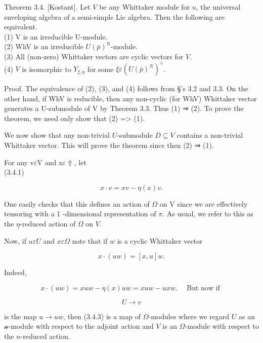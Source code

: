 \documentclass[10pt]{article}
\begin{document}
Theorem 3.4. [Kostant]. Let $V$ be any Whittaker module for $u$, the universal enveloping algebra of a semi-simple Lie algebra. Then the following are equivalent.\\
(1) V is an irreducible U-module.\\
(2) WhV is an irreducible $U(\bar{p})^{\mathrm{N}}$-module.\\
(3) All (non-zero) Whittaker vectors are cyclic vectors for $V$.\\
(4) $V$ is isomorphic to $Y_{\xi, \eta}$ for some $\xi \varepsilon\left(U(\bar{p})^{N}\right)^{\wedge}$.

Proof. The equivalence of (2), (3), and (4) follows from §'s 3.2 and 3.3. On the other hand, if WhV is reducible, then any non-cyclic (for WhV) Whittaker vector generates a U-submodule of V by Theorem 3.3. Thus (1) ⇒ (2). To prove the theorem, we need only show that (2) => (1).

We now show that any non-trivial $U$-submodule $D \subseteq V$ contains a non-trivial Whittaker vector. This will prove the theorem since then (2) ⇒ (1).

For any $\mathrm{v} \varepsilon \mathrm{V}$ and $\mathrm{x} \varepsilon \Uparrow$, let\\
(3.4.1)

$$
x \cdot v=x v-\eta(x) v .
$$

One easily checks that this defines an action of $\Omega$ on V since we are effectively tensoring with a 1 -dimensional representation of $\pi$. As usual, we refer to this as the $\eta$-reduced action of $\Omega$ on $V$.

Now, if $u \varepsilon U$ and $x \varepsilon \Omega$ note that if $w$ is a cyclic Whittaker vector


\begin{equation*}
x \cdot(u w)=[x, u] w . \tag{3.4.2}
\end{equation*}


Indeed,

$$
x \cdot(u w)=x u w-\eta(x) u w=x u w-u x w . \quad \text { But now if }
$$


\begin{equation*}
U \rightarrow v \tag{3.4.3}
\end{equation*}


is the map $u \rightarrow u w$, then (3.4.3) is a map of $\Omega$-modules where we regard $U$ as an $\mathcal{n}$-module with respect to the adjoint action and $V$ is an $\Omega$-module with respect to the $n$-reduced action.
\end{document}
